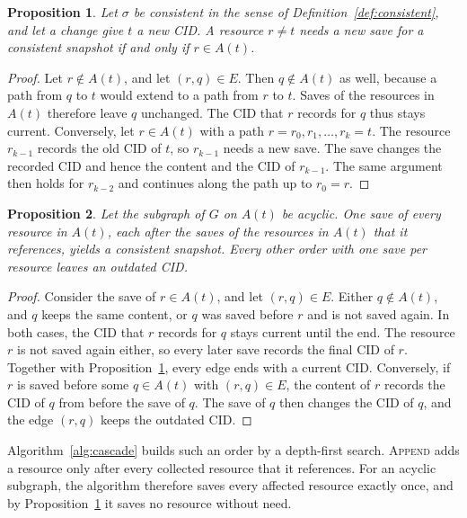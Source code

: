 \documentclass[5p,times,twocolumn]{elsarticle}
\theoremstyle{definition}
\theoremstyle{plain}
\newtheorem{proposition}{Proposition}
\begin{document}
\begin{proposition}\label{prop:affected}
Let $\sigma$ be consistent in the sense of Definition~\ref{def:consistent}, and let a change give $t$ a new CID. A resource $r \neq t$ needs a new save for a consistent snapshot if and only if $r \in A(t)$.
\end{proposition}

\begin{proof}
Let $r \notin A(t)$, and let $(r, q) \in E$. Then $q \notin A(t)$ as well, because a path from $q$ to $t$ would extend to a path from $r$ to $t$. Saves of the resources in $A(t)$ therefore leave $q$ unchanged. The CID that $r$ records for $q$ thus stays current. Conversely, let $r \in A(t)$ with a path $r = r_0, r_1, \ldots, r_k = t$. The resource $r_{k-1}$ records the old CID of $t$, so $r_{k-1}$ needs a new save. The save changes the recorded CID and hence the content and the CID of $r_{k-1}$. The same argument then holds for $r_{k-2}$ and continues along the path up to $r_0 = r$.
\end{proof}

\begin{proposition}\label{prop:order}
Let the subgraph of $G$ on $A(t)$ be acyclic. One save of every resource in $A(t)$, each after the saves of the resources in $A(t)$ that it references, yields a consistent snapshot. Every other order with one save per resource leaves an outdated CID.
\end{proposition}

\begin{proof}
Consider the save of $r \in A(t)$, and let $(r, q) \in E$. Either $q \notin A(t)$, and $q$ keeps the same content, or $q$ was saved before $r$ and is not saved again. In both cases, the CID that $r$ records for $q$ stays current until the end. The resource $r$ is not saved again either, so every later save records the final CID of $r$. Together with Proposition~\ref{prop:affected}, every edge ends with a current CID. Conversely, if $r$ is saved before some $q \in A(t)$ with $(r, q) \in E$, the content of $r$ records the CID of $q$ from before the save of $q$. The save of $q$ then changes the CID of $q$, and the edge $(r, q)$ keeps the outdated CID.
\end{proof}

Algorithm~\ref{alg:cascade} builds such an order by a depth-first search. \textsc{Append} adds a resource only after every collected resource that it references. For an acyclic subgraph, the algorithm therefore saves every affected resource exactly once, and by Proposition~\ref{prop:affected} it saves no resource without need.
\end{document}
